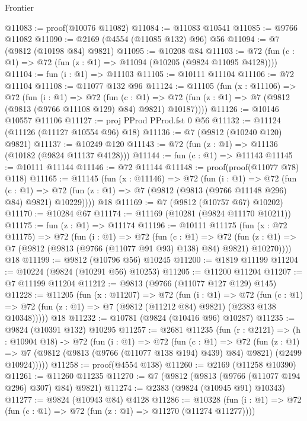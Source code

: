 \begin{lexlean}{Frontier}
\begin{coremodule}
@11083 := proof(@10076 @11082)
@11084 := @11083 @10541
@11085 := @9766 @11082
@11090 := @2169 (@4554 (@11085 @132) @96) @56
@11094 := @7 (@9812 (@10198 @84) @9821)
@11095 := @10208 @84
@11103 := @72 (fun (c : @1) => @72 (fun (z : @1) => @11094 (@10205 (@9824 @11095 @4128))))
@11104 := fun (i : @1) => @11103
@11105 := @10111 @11104
@11106 := @72 @11104
@11108 := @11077 @132 @96
@11124 := @11105
    (fun (x : @11106) =>
    @72
      (fun (i : @1) =>
      @72
        (fun (c : @1) =>
        @72 (fun (z : @1) => @7 (@9812 (@9813 (@9766 @11108 @129) @84) @9821) @10187))))
@11126 := @10146 @10557 @11106
@11127 := proj PProd PProd.fst 0 @56
@11132 := @11124 (@11126 (@11127 @10554 @96) @18)
@11136 := @7 (@9812 (@10240 @120) @9821)
@11137 := @10249 @120
@11143 := @72 (fun (z : @1) => @11136 (@10182 (@9824 @11137 @4128)))
@11144 := fun (c : @1) => @11143
@11145 := @10111 @11144
@11146 := @72 @11144
@11148 := proof(proof(@11077 @78) @118)
@11165 := @11145
    (fun (x : @11146) =>
    @72
      (fun (i : @1) =>
      @72
        (fun (c : @1) =>
        @72 (fun (z : @1) => @7 (@9812 (@9813 (@9766 @11148 @296) @84) @9821) @10229))))
    @18
@11169 := @7 (@9812 (@10757 @67) @10202)
@11170 := @10284 @67
@11174 := @11169 (@10281 (@9824 @11170 @10211))
@11175 := fun (z : @1) => @11174
@11196 := @10111
    @11175
    (fun (x : @72 @11175) =>
    @72
      (fun (i : @1) =>
      @72
        (fun (c : @1) =>
        @72 (fun (z : @1) => @7 (@9812 (@9813 (@9766 (@11077 @91 @93) @138) @84) @9821) @10270))))
    @18
@11199 := @9812 (@10796 @56) @10245
@11200 := @1819 @11199
@11204 := @10224 (@9824 (@10291 @56) @10253)
@11205 := @11200 @11204
@11207 := @7 @11199 @11204
@11212 := @9813 (@9766 (@11077 @127 @129) @145)
@11228 := @11205
    (fun (x : @11207) =>
    @72
      (fun (i : @1) =>
      @72
        (fun (c : @1) => @72 (fun (z : @1) => @7 (@9812 (@11212 @84) @9821) (@2383 @138 @10348)))))
    @18
@11232 := @10781 (@9824 (@10416 @96) @10287)
@11235 := @9824 (@10391 @132) @10295
@11257 := @2681
    @11235
    (fun (r : @2121) =>
    (h : @10904 @18) ->
    @72
      (fun (i : @1) =>
      @72
        (fun (c : @1) =>
        @72
          (fun (z : @1) =>
          @7 (@9812 (@9813 (@9766 (@11077 @138 @194) @439) @84) @9821) (@2499 @10924)))))
@11258 := proof(@4554 @138)
@11260 := @2169 (@11258 @10390)
@11261 := @11260 @11235
@11270 := @7 (@9812 (@9813 (@9766 (@11077 @194 @296) @307) @84) @9821)
@11274 := @2383 (@9824 (@10945 @91) @10343)
@11277 := @9824 (@10943 @84) @4128
@11286 := @10328
    (fun (i : @1) => @72 (fun (c : @1) => @72 (fun (z : @1) => @11270 (@11274 @11277))))

\end{coremodule}
\end{lexlean}
